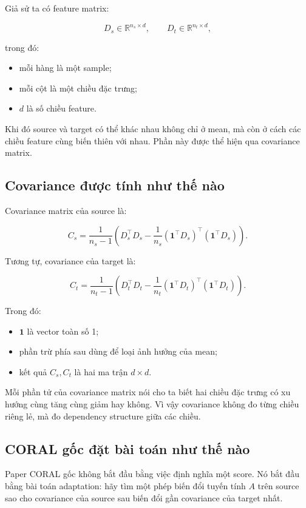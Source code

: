 \documentclass[a4paper]{article}
\begin{document}
Giả sử ta có feature matrix:

\[
D_s \in \mathbb{R}^{n_s \times d},
\qquad
D_t \in \mathbb{R}^{n_t \times d},
\]

trong đó:

\begin{itemize}
    \item mỗi hàng là một sample;
    \item mỗi cột là một chiều đặc trưng;
    \item $d$ là số chiều feature.
\end{itemize}

Khi đó source và target có thể khác nhau không chỉ ở mean, mà còn ở cách các chiều feature cùng biến thiên với nhau. Phần này được thể hiện qua covariance matrix.

\subsection{Covariance được tính như thế nào}

Covariance matrix của source là:

\[
C_s
=
\frac{1}{n_s-1}
\left(
D_s^\top D_s
-
\frac{1}{n_s}(\mathbf 1^\top D_s)^\top (\mathbf 1^\top D_s)
\right).
\]

Tương tự, covariance của target là:

\[
C_t
=
\frac{1}{n_t-1}
\left(
D_t^\top D_t
-
\frac{1}{n_t}(\mathbf 1^\top D_t)^\top (\mathbf 1^\top D_t)
\right).
\]

Trong đó:

\begin{itemize}
    \item $\mathbf 1$ là vector toàn số 1;
    \item phần trừ phía sau dùng để loại ảnh hưởng của mean;
    \item kết quả $C_s, C_t$ là hai ma trận $d \times d$.
\end{itemize}

Mỗi phần tử của covariance matrix nói cho ta biết hai chiều đặc trưng có xu hướng cùng tăng cùng giảm hay không. Vì vậy covariance không đo từng chiều riêng lẻ, mà đo dependency structure giữa các chiều.

\subsection{CORAL gốc đặt bài toán như thế nào}

Paper CORAL gốc không bắt đầu bằng việc định nghĩa một score. Nó bắt đầu bằng bài toán adaptation: hãy tìm một phép biến đổi tuyến tính $A$ trên source sao cho covariance của source sau biến đổi gần covariance của target nhất.
\end{document}
